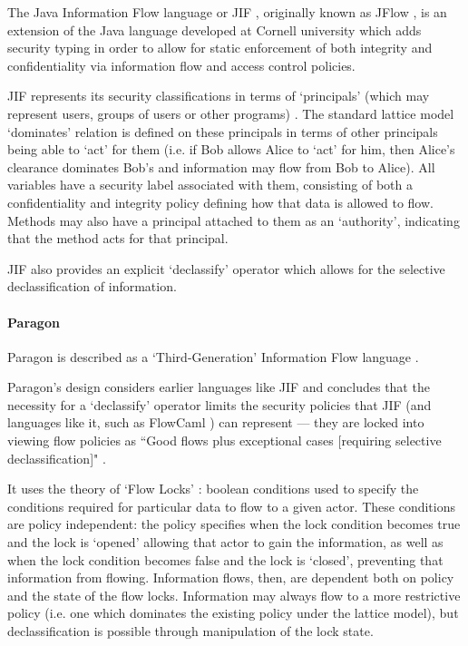 The Java Information Flow language or JIF \cite{myers2006jif}, originally known as JFlow \cite{myers1999jif}, is an extension of the Java language developed at Cornell university which adds security typing in order to allow for static enforcement of both integrity and confidentiality via information flow and access control policies.

JIF represents its security classifications in terms of `principals' (which may represent users, groups of users or other programs) \cite{pullicino2014jif}. The standard lattice model `dominates' relation is defined on these principals in terms of other principals being able to `act' for them (i.e. if Bob allows Alice to `act' for him, then Alice's clearance dominates Bob's and information may flow from Bob to Alice). All variables have a security label associated with them, consisting of both a confidentiality and integrity policy defining how that data is allowed to flow. Methods may also have a principal attached to them as an `authority', indicating that the method acts for that principal.

JIF also provides an explicit `declassify' operator which allows for the selective declassification of information.

\paragraph{Paragon}

Paragon is described as a `Third-Generation' Information Flow language \cite{broberg2013paragon}.

Paragon's design considers earlier languages like JIF and concludes that the necessity for a `declassify' operator limits the security policies that JIF (and languages like it, such as FlowCaml \cite{simonet2003flow}) can represent --- they are locked into viewing flow policies as ``Good flows plus exceptional cases [requiring selective declassification]" \cite{broberg2013paragon}.

It uses the theory of `Flow Locks' \cite{broberg2010paralocks}: boolean conditions used to specify the conditions required for particular data to flow to a given actor. These conditions are policy independent: the policy specifies when the lock condition becomes true and the lock is `opened' allowing that actor to gain the information, as well as when the lock condition becomes false and the lock is `closed', preventing that information from flowing. Information flows, then, are dependent both on policy and the state of the flow locks. Information may always flow to a more restrictive policy (i.e. one which dominates the existing policy under the lattice model), but declassification is possible through manipulation of the lock state.

